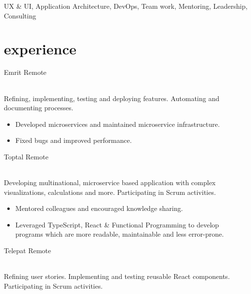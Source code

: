 \documentclass[]{cv-style}          %
\begin{document}
UX \& UI, Application Architecture, DevOps, Team work, Mentoring, Leadership, Consulting


\section{experience}

\begin{entrylist}
  \entry
  {}
  {Emrit}
  {Remote}
  {\\
    Refining, implementing, testing and deploying features. Automating and documenting processes.\\
    \subtitle{Detailed achievements:}
    \begin{itemize}
      \item Developed microservices and maintained microservice infrastructure.
      \item Fixed bugs and improved performance.
    \end{itemize}}
  \entry
  {}
  {Toptal}
  {Remote}
  {\\
    Developing multinational, microservice based application with complex visualizations, calculations and more. Participating in Scrum activities.\\
    \subtitle{Detailed achievements:}
    \begin{itemize}
      \item Mentored colleagues and encouraged knowledge sharing.
      \item Leveraged TypeScript, React \& Functional Programming to develop programs which are more readable, maintainable and less error-prone.
    \end{itemize}}
  \entry
  {}
  {Telepat}
  {Remote}
  {\\
    Refining user stories. Implementing and testing reusable React components. Participating in Scrum activities.\\
    \subtitle{Detailed achievements:}
    \begin{itemize}

\end{itemize}}
\end{entrylist}
\end{document}
